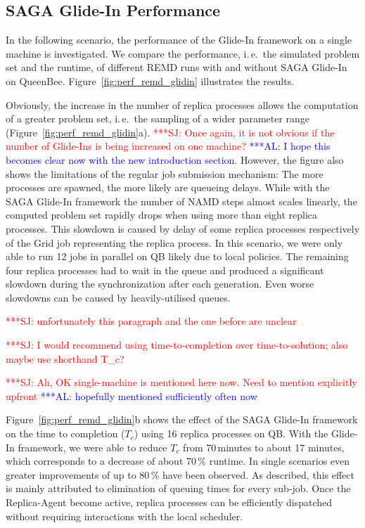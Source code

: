\documentclass{rspublic}
\newcommand{\alnote}[1]{ {\textcolor{blue} { ***AL: #1 }}}
\newcommand{\jhanote}[1]{ {\textcolor{red} { ***SJ: #1 }}}
\newcommand{\alnote}[1]{}
\newcommand{\jhanote}[1]{}
\begin{document}
{\subsection{SAGA Glide-In Performance}

In the following scenario, the performance of the Glide-In framework on a single
machine is investigated. We compare the performance, i.\,e.\ the simulated
problem set and the runtime, of different REMD runs with and without 
SAGA Glide-In on QueenBee. Figure~\ref{fig:perf_remd_glidin} illustrates the results.

Obviously, the increase in the number of replica processes allows 
the computation of a greater problem set, i.\,e.\ the sampling of a wider parameter range (Figure~\ref{fig:perf_remd_glidin}a).
\jhanote{Once again, it is not obvious if the number of Glide-Ins is
  being increased on one machine?} 
\alnote{I hope this becomes clear now with the new introduction section.} 
However, the figure also shows the limitations of the regular job submission 
mechanism: The more processes are spawned, the more likely are queueing delays. 
While with the SAGA Glide-In framework the number of NAMD steps almost scales
linearly, the computed problem set rapidly drops when using more than
eight replica processes. This slowdown is caused by delay of some replica processes respectively
of the Grid job representing the replica process. In this scenario, 
we were only able to run 12 jobs in parallel on QB likely due
to local policies. The remaining four replica processes had to wait in the queue and
produced a significant slowdown during the synchronization after each generation.
Even worse slowdowns can be caused by heavily-utilised queues.

\jhanote{unfortunately this paragraph and the one before are unclear}

\jhanote{I would recommend using time-to-completion over
  time-to-solution; also maybe use shorthand T\_c?}
 
\jhanote{Ah, OK single-machine is mentioned here now. Need to mention
    explicitly upfront}
\alnote{hopefully mentioned sufficiently often now}      

Figure~\ref{fig:perf_remd_glidin}b shows the effect of the SAGA Glide-In framework
on the time to completion ($T_{c}$) using 16 replica processes on QB. 
With the Glide-In framework, we were able to reduce $T_{c}$ from 70\,minutes
to about 17 minutes, which corresponds to a decrease of about 70\,\% runtime. 
In single scenarios even greater improvements of up to 80\,\% have been 
observed. As described, this effect is mainly attributed to elimination of 
queuing times for every sub-job. Once the Replica-Agent become active, 
replica processes can be efficiently 
dispatched without requiring interactions with the local scheduler. 

}
\end{document}
